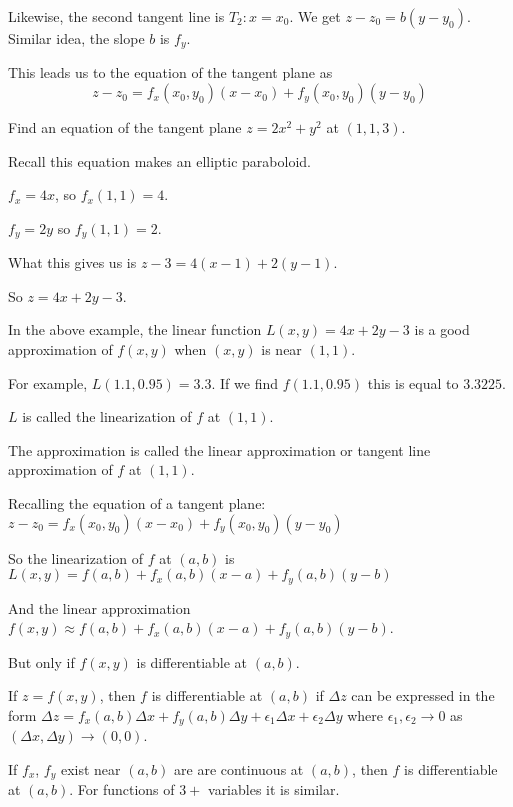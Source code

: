 \documentclass[../calc3.tex]{subfiles}
\begin{document}
Likewise, the second tangent line is $T_2: x=x_0$. We get $z-z_0=b(y-y_0)$. Similar idea, the slope $b$ is $f_y$.

This leads us to the equation of the tangent plane as 
\[ z-z_0 = f_x(x_0,y_0)(x-x_0)+f_y(x_0,y_0)(y-y_0)\]

\pagebreak
\begin{example}
    Find an equation of the tangent plane $z=2x^2+y^2$ at $(1,1,3)$.

    Recall this equation makes an elliptic paraboloid.

    $f_x=4x$, so $f_x(1,1)=4$.

    $f_y=2y$ so $f_y(1,1)=2$.

    What this gives us is $z-3=4(x-1)+2(y-1)$.

    So $z=4x+2y-3$.
\end{example}

In the above example, the linear function $L(x,y)=4x+2y-3$ is a good approximation of $f(x,y)$ when $(x,y)$ is near $(1,1)$.

For example, $L(1.1,0.95)=3.3$. If we find $f(1.1,0.95)$ this is equal to $3.3225$.

$L$ is called the linearization of $f$ at $(1,1)$.

The approximation is called the linear approximation or tangent line approximation of $f$ at $(1,1)$.

Recalling the equation of a tangent plane: $z-z_0 = f_x(x_0,y_0)(x-x_0)+f_y(x_0,y_0)(y-y_0)$

So the linearization of $f$ at $(a,b)$ is $L(x,y)=f(a,b)+f_x(a,b)(x-a)+f_y(a,b)(y-b)$

And the linear approximation $f(x,y)\approx f(a,b)+f_x(a,b)(x-a)+f_y(a,b)(y-b)$.

But only if $f(x,y)$ is differentiable at $(a,b)$.

\begin{definition}
    If $z=f(x,y)$, then $f$ is differentiable at $(a,b)$ if $\Delta z$ can be expressed in the form $\Delta z=f_x(a,b)\Delta x+f_y(a,b)\Delta y+\epsilon_1 \Delta x+\epsilon_2\Delta y$ where $\epsilon_1, \epsilon_2 \rightarrow 0$ as $(\Delta x, \Delta y)\rightarrow (0,0)$.
\end{definition}

\begin{theorem}
    If $f_x$, $f_y$ exist near $(a,b)$ are are continuous at $(a,b)$, then $f$ is differentiable at $(a,b)$. For functions of $3+$ variables it is similar.
\end{theorem}
\end{document}
